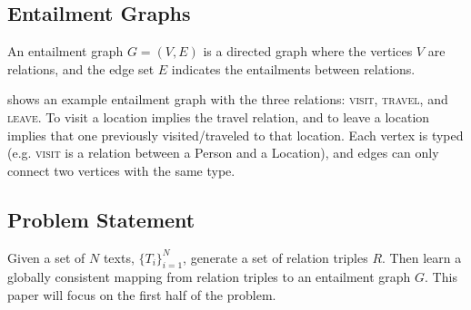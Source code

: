 \subsection{Entailment Graphs}
An entailment graph $G=(V,E)$ is a directed graph where the vertices $V$
are relations, and the edge set $E$ indicates the entailments between
relations.

 shows an example entailment graph with the three relations:
\textsc{visit}, \textsc{travel}, and \textsc{leave}. 
To visit a location implies the travel relation,
and to leave a location implies that one previously visited/traveled to that
location. Each vertex is typed (e.g. \textsc{visit} is a relation between
a Person and a Location), and edges can only connect two vertices with
the same type.

\subsection{Problem Statement}
Given a set of $N$ texts, $\{T_i\}_{i=1}^{N}$, generate a set of 
relation triples $R$. Then learn a globally consistent mapping
from relation triples to an entailment graph $G$. This paper will focus
on the first half of the problem.


